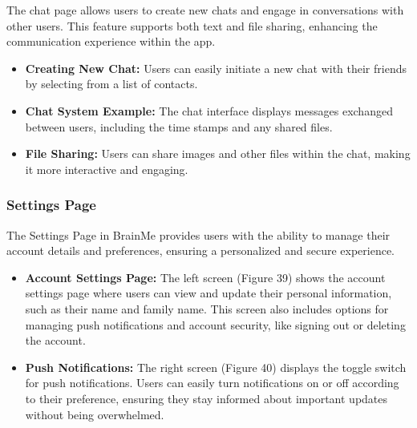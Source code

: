 The chat page allows users to create new chats and engage in conversations with other users. This feature supports both text and file sharing, enhancing the communication experience within the app.

\begin{itemize}
    \item \textbf{Creating New Chat:} Users can easily initiate a new chat with their friends by selecting from a list of contacts.
    \item \textbf{Chat System Example:} The chat interface displays messages exchanged between users, including the time stamps and any shared files.
    \item \textbf{File Sharing:} Users can share images and other files within the chat, making it more interactive and engaging.
\end{itemize}

\vspace{1cm}

\subsubsection{Settings Page}

The Settings Page in BrainMe provides users with the ability to manage their account details and preferences, ensuring a personalized and secure experience.

\begin{itemize}
\item \textbf{Account Settings Page:} The left screen (Figure 39) shows the account settings page where users can view and update their personal information, such as their name and family name. This screen also includes options for managing push notifications and account security, like signing out or deleting the account.
\item \textbf{Push Notifications:} The right screen (Figure 40) displays the toggle switch for push notifications. Users can easily turn notifications on or off according to their preference, ensuring they stay informed about important updates without being overwhelmed.
\end{itemize}

